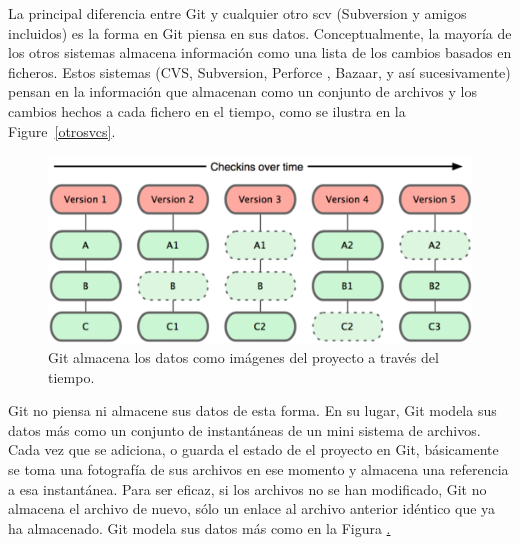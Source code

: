 \documentclass[12pt, spanish, oneside, onecolumn, a4paper]{report}
\begin{document}
La principal diferencia entre Git y cualquier otro \gls{scv} (Subversion y amigos incluidos) es la forma en Git piensa en sus datos. Conceptualmente, la mayoría de los otros sistemas almacena información como una lista de los cambios basados en ficheros. Estos sistemas (CVS, Subversion, Perforce , Bazaar, y así sucesivamente) pensan en la información que almacenan como un conjunto de archivos y los cambios hechos a cada fichero en el tiempo, como se ilustra en la Figure~\ref{otrosvcs}.


\begin{figure}
  \begin{center}
  \includegraphics[width=.6\textwidth,keepaspectratio=true]{18333fig0105-tn.png}
  \end{center}
  \caption{Git almacena los datos como imágenes del proyecto a través del tiempo.}
  \label{gitsnapshot}
\end{figure}
Git no piensa ni almacene sus datos de esta forma. En su lugar, Git modela sus datos más como un conjunto de instantáneas de un mini
sistema de archivos. Cada vez que se adiciona, o guarda el estado de el proyecto en Git, básicamente se toma una fotografía de sus archivos en ese momento y almacena una referencia a esa instantánea. Para ser eficaz, si los archivos no se han modificado, Git no almacena el archivo de nuevo, sólo un enlace al archivo anterior idéntico que ya ha almacenado. Git modela sus datos más como en la Figura \href{gitsnapshot}.
\end{document}
